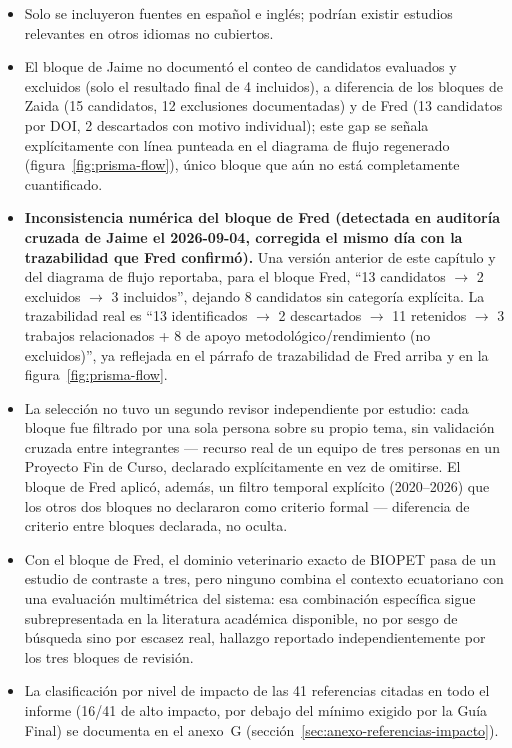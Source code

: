 \begin{itemize}[nosep]
  \item Solo se incluyeron fuentes en espa\~nol e ingl\'es; podr\'ian existir
    estudios relevantes en otros idiomas no cubiertos.
  \item El bloque de Jaime no document\'o el conteo de candidatos evaluados
    y excluidos (solo el resultado final de 4 incluidos), a diferencia de
    los bloques de Zaida (15 candidatos, 12 exclusiones documentadas) y de
    Fred (13 candidatos por DOI, 2 descartados con motivo individual);
    este gap se se\~nala expl\'icitamente con l\'inea punteada en el
    diagrama de flujo regenerado (figura~\ref{fig:prisma-flow}), \'unico
    bloque que a\'un no est\'a completamente cuantificado.
  \item \textbf{Inconsistencia num\'erica del bloque de Fred (detectada en
    auditor\'ia cruzada de Jaime el 2026-09-04, corregida el mismo d\'ia
    con la trazabilidad que Fred confirm\'o).} Una versi\'on anterior de
    este cap\'itulo y del diagrama de flujo reportaba, para el bloque
    Fred, ``13 candidatos $\to$ 2 excluidos $\to$ 3 incluidos'', dejando 8
    candidatos sin categor\'ia expl\'icita. La trazabilidad real es ``13
    identificados $\to$ 2 descartados $\to$ 11 retenidos $\to$ 3 trabajos
    relacionados + 8 de apoyo metodol\'ogico/rendimiento (no excluidos)'',
    ya reflejada en el p\'arrafo de trazabilidad de Fred arriba y en la
    figura~\ref{fig:prisma-flow}.
  \item La selecci\'on no tuvo un segundo revisor independiente por
    estudio: cada bloque fue filtrado por una sola persona sobre su propio
    tema, sin validaci\'on cruzada entre integrantes --- recurso real de un
    equipo de tres personas en un Proyecto Fin de Curso, declarado
    expl\'icitamente en vez de omitirse. El bloque de Fred aplic\'o,
    adem\'as, un filtro temporal expl\'icito (2020--2026) que los otros dos
    bloques no declararon como criterio formal --- diferencia de criterio
    entre bloques declarada, no oculta.
  \item Con el bloque de Fred, el dominio veterinario exacto de BIOPET pasa
    de un estudio de contraste a tres, pero ninguno combina el contexto
    ecuatoriano con una evaluaci\'on multim\'etrica del sistema: esa
    combinaci\'on espec\'ifica sigue subrepresentada en la literatura
    acad\'emica disponible, no por sesgo de b\'usqueda sino por escasez
    real, hallazgo reportado independientemente por los tres bloques de
    revisi\'on.
  \item La clasificaci\'on por nivel de impacto de las 41 referencias
    citadas en todo el informe (16/41 de alto impacto, por debajo del
    m\'inimo exigido por la Gu\'ia Final) se documenta en el anexo~G
    (secci\'on~\ref{sec:anexo-referencias-impacto}).
\end{itemize}
